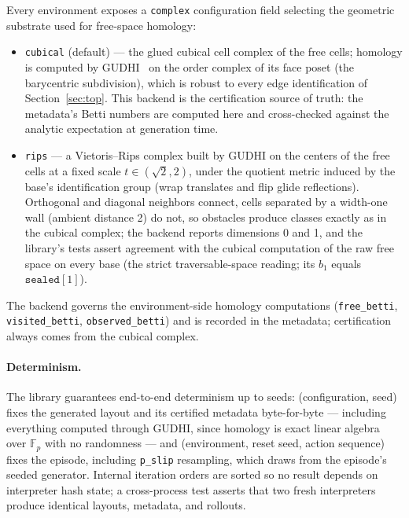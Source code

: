 \documentclass[11pt]{article}
\newcommand{\F}{\mathbb{F}}
\begin{document}
Every environment exposes a \texttt{complex} configuration field
selecting the geometric substrate used for free-space homology:
\begin{itemize}[leftmargin=2em, itemsep=1pt]
  \item \texttt{cubical} (default) --- the glued cubical cell complex of
        the free cells; homology is computed by
        GUDHI~\cite{maria14} on the order
        complex of its face poset (the barycentric subdivision), which is
        robust to every edge identification of
        Section~\ref{sec:top}. This backend is the certification source
        of truth: the metadata's Betti numbers are computed here and
        cross-checked against the analytic expectation at generation
        time.
  \item \texttt{rips} --- a Vietoris--Rips complex built by GUDHI on the
        centers of the free cells at a fixed scale
        $t \in (\sqrt{2}, 2)$, under the quotient metric induced by the
        base's identification group (wrap translates and flip glide
        reflections). Orthogonal and diagonal neighbors connect, cells
        separated by a width-one wall (ambient distance 2) do not, so
        obstacles produce classes exactly as in the cubical complex; the
        backend reports dimensions 0 and 1, and the library's tests
        assert agreement with the cubical computation of the raw free
        space on every base (the strict traversable-space reading;
        its $b_1$ equals $\texttt{sealed}[1]$).
\end{itemize}
The backend governs the environment-side homology computations
(\texttt{free\_betti}, \texttt{visited\_betti},
\texttt{observed\_betti}) and is recorded in the metadata; certification
always comes from the cubical complex.

\paragraph{Determinism.} The library guarantees end-to-end determinism
up to seeds: (configuration, seed) fixes the generated layout and its
certified metadata byte-for-byte --- including everything computed
through GUDHI, since homology is exact linear algebra over
$\F_p$ with no randomness --- and (environment, reset seed, action
sequence) fixes the episode, including \texttt{p\_slip} resampling,
which draws from the episode's seeded generator. Internal iteration
orders are sorted so no result depends on interpreter hash state; a
cross-process test asserts that two fresh interpreters produce
identical layouts, metadata, and rollouts.
\end{document}
